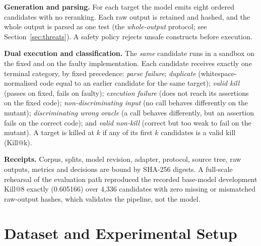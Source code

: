 \documentclass[conference,a4paper]{IEEEtran}
\makeatletter
\newcommand{\killk}[1]{Kill@#1}
\makeatother
\begin{document}
\textbf{Generation and parsing.} For each target the model emits eight ordered
candidates with no reranking. Each raw output is retained and hashed, and the whole
output is parsed as one test (the \emph{whole-output} protocol; see
Section~\ref{sec:threats}). A safety policy rejects unsafe constructs before execution.

\textbf{Dual execution and classification.} The \emph{same} candidate runs in a
sandbox on the fixed and on the faulty implementation. Each candidate receives exactly
one terminal category, by fixed precedence: \emph{parse failure};
\emph{duplicate} (whitespace-normalised code equal to an earlier candidate for the same
target); \emph{valid kill} (passes on fixed, fails on faulty); \emph{execution
failure} (does not reach its assertions on the fixed code); \emph{non-discriminating
input} (no call behaves differently on the mutant); \emph{discriminating wrong oracle}
(a call behaves differently, but an assertion fails on the correct code); and
\emph{valid non-kill} (correct but too weak to fail on the mutant). A target is
killed at $k$ if any of its first $k$ candidates is a valid kill (\killk{k}).

\textbf{Receipts.} Corpus, splits, model revision, adapter, protocol, source tree,
raw outputs, metrics and decisions are bound by SHA-256 digests. A full-scale
rehearsal of the evaluation path reproduced the recorded base-model development
\killk{8} exactly (0.605166) over 4,336 candidates with zero missing or mismatched
raw-output hashes, which validates the pipeline, not the model.

\section{Dataset and Experimental Setup}
\end{document}
